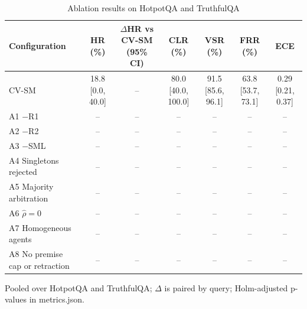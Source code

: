 \begin{table}[!t]
\centering
\caption{Ablation results on HotpotQA and TruthfulQA}
\label{tab:ablation}
\footnotesize
\begin{tabular}{lcccccc}
\hline
Configuration & HR (\%) & $\Delta$HR vs CV-SM (95\% CI) & CLR (\%) & VSR (\%) & FRR (\%) & ECE \\
\hline
CV-SM & 18.8 [0.0, 40.0] & -- & 80.0 [40.0, 100.0] & 91.5 [85.6, 96.1] & 63.8 [53.7, 73.1] & 0.29 [0.21, 0.37] \\
A1 $-$R1 & -- & -- & -- & -- & -- & -- \\
A2 $-$R2 & -- & -- & -- & -- & -- & -- \\
A3 $-$SML & -- & -- & -- & -- & -- & -- \\
A4 Singletons rejected & -- & -- & -- & -- & -- & -- \\
A5 Majority arbitration & -- & -- & -- & -- & -- & -- \\
A6 $\hat\rho = 0$ & -- & -- & -- & -- & -- & -- \\
A7 Homogeneous agents & -- & -- & -- & -- & -- & -- \\
A8 No premise cap or retraction & -- & -- & -- & -- & -- & -- \\
\hline
\end{tabular}
\par\smallskip\parbox{\textwidth}{\footnotesize Pooled over HotpotQA and TruthfulQA; $\Delta$ is paired by query; Holm-adjusted p-values in metrics.json.}
\end{table}
